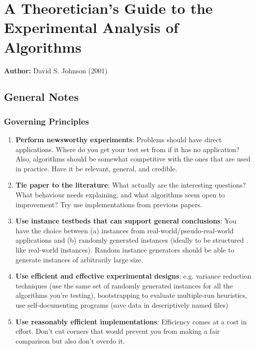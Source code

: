 \section{A Theoretician's Guide to the Experimental Analysis of Algorithms}

\textbf{Author:} David S. Johnson (2001)

\subsection{General Notes}

\subsubsection{Governing Principles}

\begin{enumerate}
    \item \textbf{Perform newsworthy experiments}: Problems should have direct applications. Where do you get your test set from if it has no application? Also, algorithms should be somewhat competitive with the ones that are used in practice. Have it be relevant, general, and credible.
    
    \item \textbf{Tie paper to the literature}: What actually are the interesting questions? What behaviour needs explaining, and what algorithms seem open to improvement? Try use implementations from previous papers.
    
    \item \textbf{Use instance testbeds that can support general conclusions}: You have the choice between (a) instances from real-world/pseudo-real-world applications and (b) randomly generated instances (ideally to be structured like real-world instances). Random instance generators should be able to generate instances of arbitrarily large size.
    
    \item \textbf{Use efficient and effective experimental designs}: e.g. variance reduction techniques (use the same set of randomly generated instances for all the algorithms you're testing), bootstrapping to evaluate multiple-run heuristics, use self-documenting programs (save data in descriptively named files)
    
    \item \textbf{Use reasonably efficient implementations}: Efficiency comes at a cost in effort. Don't cut corners that would prevent you from making a fair comparison but also don't overdo it.
    

\end{enumerate}
